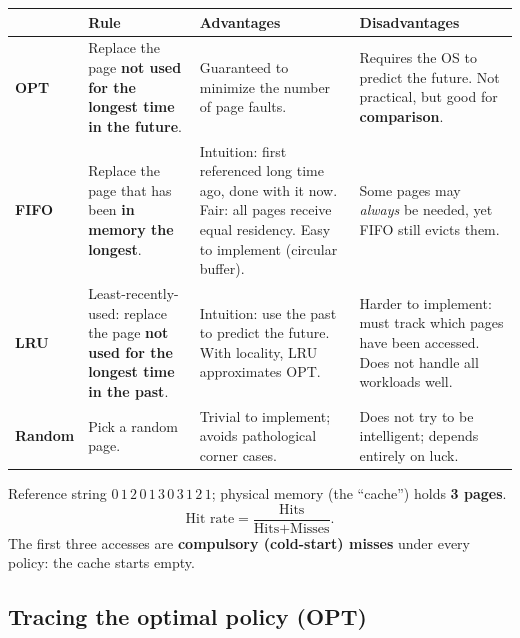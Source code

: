 \documentclass[11pt,a4paper]{article}
\begin{document}
\begin{center}
\renewcommand{\arraystretch}{1.25}
\begin{tabularx}{\textwidth}{@{}>{\bfseries}l*{3}{>{\raggedright\arraybackslash}X}@{}}
  \toprule
  & \textbf{Rule} & \textbf{Advantages} & \textbf{Disadvantages} \\
  \midrule
  OPT  & Replace the page \textbf{not used for the longest time in the future}.
       & Guaranteed to minimize the number of page faults.
       & Requires the OS to predict the future. Not practical, but good for
         \textbf{comparison}. \\
  FIFO & Replace the page that has been \textbf{in memory the longest}.
       & Intuition: first referenced long time ago, done with it now.
         Fair: all pages receive equal residency. Easy to implement
         (circular buffer).
       & Some pages may \emph{always} be needed, yet FIFO still evicts them. \\
  LRU  & Least-recently-used: replace the page \textbf{not used for the
         longest time in the past}.
       & Intuition: use the past to predict the future. With locality,
         LRU approximates OPT.
       & Harder to implement: must track which pages have been accessed.
         Does not handle all workloads well. \\
  Random & Pick a random page.
       & Trivial to implement; avoids pathological corner cases.
       & Does not try to be intelligent; depends entirely on luck. \\
  \bottomrule
\end{tabularx}
\end{center}

\begin{keybox}
Reference string \(0\,1\,2\,0\,1\,3\,0\,3\,1\,2\,1\); physical memory
(the ``cache'') holds \textbf{3 pages}.
\[
  \text{Hit rate} = \frac{\text{Hits}}{\text{Hits}+\text{Misses}}.
\]
The first three accesses are \textbf{compulsory (cold-start) misses}
under every policy: the cache starts empty.
\end{keybox}

\subsection{Tracing the optimal policy (OPT)}
\end{document}
